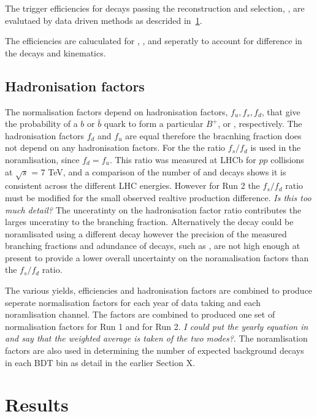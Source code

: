 The trigger efficiencies for decays passing the reconstruction and selection, , are evalutaed by data driven methods as descrided in~\ref{}. 

The efficiencies are caluculated for \bsmumu, \bdmumu, \bdkpi and \bujpsik seperatly to account for difference in the decays and kinematics.

\subsection{Hadronisation factors}

The normalisation factors depend on hadronisation factors, $f_{u}, f_{s}, f_{d}$, that give the probability of a $b$ or $\bar{b}$ quark to form a particular $B^{+}$, \bs or \bd, respectively. The hadronisation factors $f_{d}$ and $f_{u}$ are equal therefore the \bmumu bracnhing fraction does not depend on any hadronisation factors. For the \bsmumu the ratio $f_{s}/f_{d}$ is used in the noramlisation, since $f_{d} = f_{u}$. This ratio was measured at LHCb for $pp$ collisions at $\sqrt{s}$ = 7 TeV, and a comparison of the number of \bujpsik and \bsjpisphi decays shows it is consistent across the different LHC energies. However for Run 2 the $f_{s}/f_{d}$ ratio must be modified for the small observed realtive production difference. {\it Is this too much detail?}
The unceratinty on the hadronisation factor ratio contributes the larges unceratiny to the \bsmumu branching fraction. Alternatively the \bsmumu decay could be noramlisated using a different \bs decay however the precision of the measured branching fractions and adundance of \bs decays, such as \bsjpsiphi, are not high enough at present to provide a lower overall uncertainty on the noramalisation factors than the $f_{s}/f_{d}$ ratio.


The various yields, efficiencies and hadronisation factors are combined to produce seperate normalisation factors for each year of data taking and each noramlisation channel. The factors are combined to produced one set of normalisation factors for Run 1 and for Run 2.  {\it I could put the yearly equation in and say that the weighted average is taken of the two modes?}. The \bujpsik noramlisation factors are also used in determining the number of expected background decays in each BDT bin as detail in the earlier Section X. 


\section{Results}

